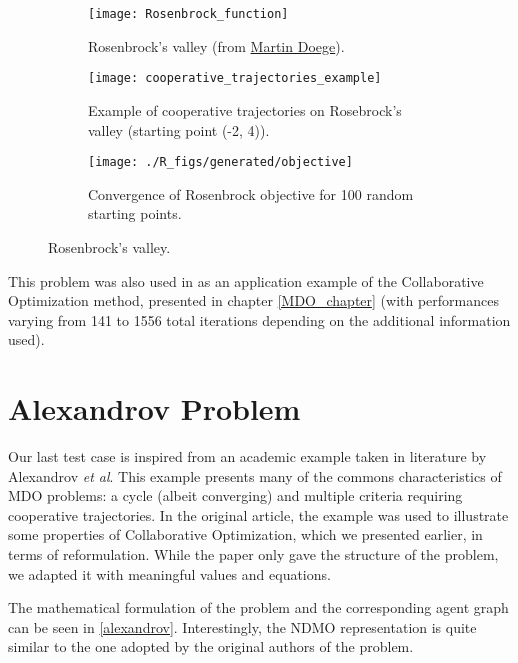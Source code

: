 \begin{figure}
\centering
	\begin{subfigure}{0.45\textwidth}
		\texttt{[image: Rosenbrock\_function]}
		\caption{Rosenbrock's valley (from \href{http://commons.wikimedia.org/wiki/File:Rosenbrock_function.svg}{Martin Doege}).}\label{rosenbrock_plot}
	\end{subfigure}
	\hfill%
	\begin{subfigure}{0.45\textwidth}	
		\centering
		\texttt{[image: cooperative\_trajectories\_example]}
		\caption{Example of cooperative trajectories on Rosebrock's valley (starting point (-2, 4)).}\label{collective_traj_rosenbrock_plot}
	\end{subfigure}
	
	\begin{subfigure}{0.4\textwidth}
		\centering
		\texttt{[image: ./R\_figs/generated/objective]}	
		\caption{Convergence of Rosenbrock objective for 100 random starting points.}\label{rosenbrock_res}
	\end{subfigure}
\caption{Rosenbrock's valley.}
\end{figure}

This problem was also used in \cite{Ilan:1994:MOM:887207} as an application example of the Collaborative Optimization method, presented in chapter \ref{MDO_chapter} (with performances varying from 141 to 1556 total iterations depending on the additional information used).

\section{Alexandrov Problem}

Our last test case is inspired from an academic example taken in literature by Alexandrov \emph{et al}\cite{alexandrov2002analytical}. This example presents many of the commons characteristics of MDO problems: a cycle (albeit converging) and multiple criteria requiring cooperative trajectories. In the original article, the example was used to illustrate some properties of Collaborative Optimization, which we presented earlier, in terms of reformulation. While the paper only gave the structure of the problem, we adapted it with meaningful values and equations.

The mathematical formulation of the problem and the corresponding agent graph can be seen in \figurename{} \ref{alexandrov}. Interestingly, the NDMO representation is quite similar to the one adopted by the original authors of the problem.

